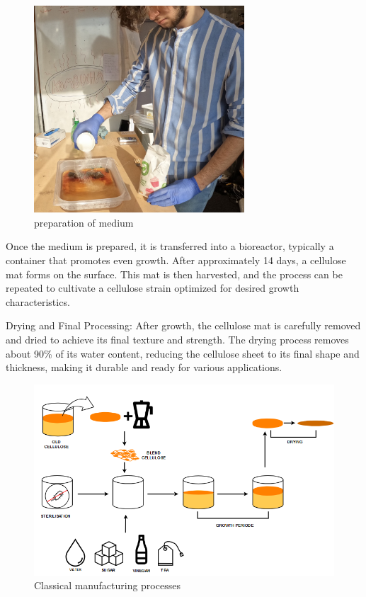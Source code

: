 \begin{figure}[h]
    \centering
    \includegraphics[width=0.7\textwidth]{images/preparation.png}
    \caption{preparation of medium}
    \label{fig:manufactureperso2}
\end{figure} 
Once the medium is prepared, it is transferred into a bioreactor, typically a container that promotes even growth. After approximately 14 days, a cellulose mat forms on the surface. This mat is then harvested, and the process can be repeated to cultivate a cellulose strain optimized for desired growth characteristics.

Drying and Final Processing: After growth, the cellulose mat is carefully removed and dried to achieve its final texture and strength. The drying process removes about 90\% of its water content, reducing the cellulose sheet to its final shape and thickness, making it durable and ready for various applications.



\begin{figure}[h]
    \centering
    \includegraphics[width=1.2\textwidth]{images/SCOBY_diag.png}
    \caption{Classical manufacturing processes}
    \label{fig:manufacture}
\end{figure} 

